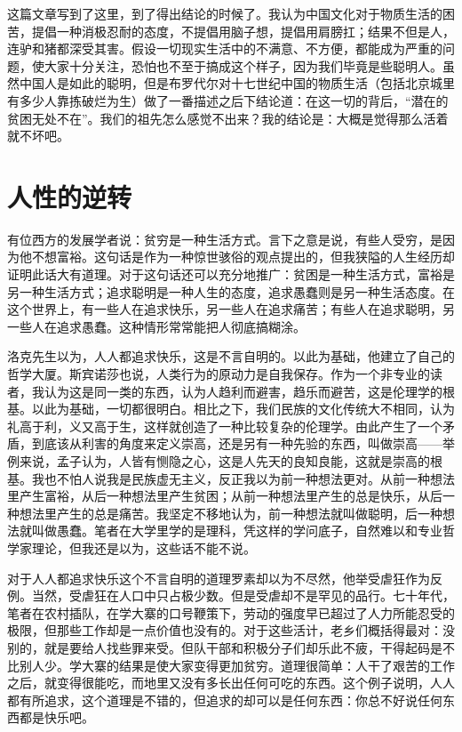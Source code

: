 这篇文章写到了这里，到了得出结论的时候了。我认为中国文化对于物质生活的困苦，提倡一种消极忍耐的态度，不提倡用脑子想，提倡用肩膀扛；结果不但是人，连驴和猪都深受其害。假设一切现实生活中的不满意、不方便，都能成为严重的问题，使大家十分关注，恐怕也不至于搞成这个样子，因为我们毕竟是些聪明人。虽然中国人是如此的聪明，但是布罗代尔对十七世纪中国的物质生活（包括北京城里有多少人靠拣破烂为生）做了一番描述之后下结论道：在这一切的背后，“潜在的贫困无处不在”。我们的祖先怎么感觉不出来？我的结论是：大概是觉得那么活着就不坏吧。

\chapter{人性的逆转}

有位西方的发展学者说：贫穷是一种生活方式。言下之意是说，有些人受穷，是因为他不想富裕。这句话是作为一种惊世骇俗的观点提出的，但我狭隘的人生经历却证明此话大有道理。对于这句话还可以充分地推广：贫困是一种生活方式，富裕是另一种生活方式；追求聪明是一种人生的态度，追求愚蠢则是另一种生活态度。在这个世界上，有一些人在追求快乐，另一些人在追求痛苦；有些人在追求聪明，另一些人在追求愚蠢。这种情形常常能把人彻底搞糊涂。 

洛克先生以为，人人都追求快乐，这是不言自明的。以此为基础，他建立了自己的哲学大厦。斯宾诺莎也说，人类行为的原动力是自我保存。作为一个非专业的读者，我认为这是同一类的东西，认为人趋利而避害，趋乐而避苦，这是伦理学的根基。以此为基础，一切都很明白。相比之下，我们民族的文化传统大不相同，认为礼高于利，义又高于生，这样就创造了一种比较复杂的伦理学。由此产生了一个矛盾，到底该从利害的角度来定义崇高，还是另有一种先验的东西，叫做崇高——举例来说，孟子认为，人皆有恻隐之心，这是人先天的良知良能，这就是崇高的根基。我也不怕人说我是民族虚无主义，反正我以为前一种想法更对。从前一种想法里产生富裕，从后一种想法里产生贫困；从前一种想法里产生的总是快乐，从后一种想法里产生的总是痛苦。我坚定不移地认为，前一种想法就叫做聪明，后一种想法就叫做愚蠢。笔者在大学里学的是理科，凭这样的学问底子，自然难以和专业哲学家理论，但我还是以为，这些话不能不说。 

对于人人都追求快乐这个不言自明的道理罗素却以为不尽然，他举受虐狂作为反例。当然，受虐狂在人口中只占极少数。但是受虐却不是罕见的品行。七十年代，笔者在农村插队，在学大寨的口号鞭策下，劳动的强度早已超过了人力所能忍受的极限，但那些工作却是一点价值也没有的。对于这些活计，老乡们概括得最对：没别的，就是要给人找些罪来受。但队干部和积极分子们却乐此不疲，干得起码是不比别人少。学大寨的结果是使大家变得更加贫穷。道理很简单：人干了艰苦的工作之后，就变得很能吃，而地里又没有多长出任何可吃的东西。这个例子说明，人人都有所追求，这个道理是不错的，但追求的却可以是任何东西：你总不好说任何东西都是快乐吧。 

